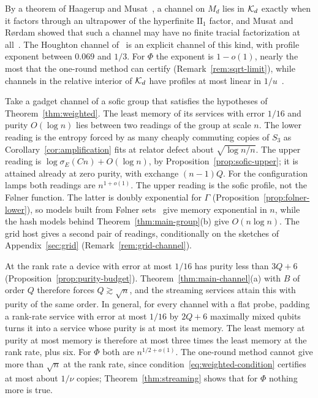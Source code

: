 By a theorem of Haagerup and Musat~\cite[Theorem~3.6]{HaagerupMusat2015}, a channel on $M_d$ lies in $\mathcal K_d$ exactly when it factors through an
ultrapower of the hyperfinite $\mathrm{II}_1$ factor, and Musat and R{\o}rdam showed that such a channel may have no finite tracial
factorization at all~\cite{MusatRordam2020}. The Houghton channel of~\cite[Theorem~D.1]{DouglasMghirbiB} is an explicit channel of this kind,
with profile exponent between $0.069$ and $1/3$. For $\Phi$ the exponent is $1-o(1)$, nearly the most that the one-round method can certify
(Remark~\ref{rem:sqrt-limit}), while channels in the relative interior of $\mathcal K_d$ have profiles at most linear in
$1/u$~\cite[Section~10]{DouglasMghirbiB}.

\begin{remark}\label{rem:sandwich}
Take a gadget channel of a sofic group that satisfies the hypotheses of Theorem~\ref{thm:weighted}. The least memory of its services with error
$1/16$ and purity $O(\log n)$ lies between two readings of the group at scale $n$. The lower reading is the entropy forced by as many cheaply
commuting copies of $S_3$ as Corollary~\ref{cor:amplification} fits at relator defect about $\sqrt{\log n/n}$. The upper reading is
$\log\sigma_E(Cn)+O(\log n)$, by Proposition~\ref{prop:sofic-upper}; it is attained already at zero purity, with exchange $(n-1)Q$. For the
configuration lamps both readings are $n^{1+o(1)}$. The upper reading is the sofic profile, not the F{\o}lner function. The latter is doubly
exponential for $\Gamma$ (Proposition~\ref{prop:folner-lower}), so models built from F{\o}lner sets~\cite[Proposition~3.14]{Cornulier2013} give
memory exponential in $n$, while the hash models behind Theorem~\ref{thm:main-group}(b) give $O(n\log n)$. The grid host gives a second pair
of readings, conditionally on the sketches of Appendix~\ref{sec:grid} (Remark~\ref{rem:grid-channel}).
\end{remark}

\begin{remark}\label{rem:sqrt-limit}
At the rank rate a device with error at most $1/16$ has purity less than $3Q+6$ (Proposition~\ref{prop:purity-budget}).
Theorem~\ref{thm:main-channel}(a) with $B$ of order $Q$ therefore forces $Q\gtrsim\sqrt n$, and the streaming services attain this with purity
of the same order. In general, for every channel with a flat probe, padding a rank-rate service with error at most $1/16$ by $2Q+6$ maximally mixed
qubits turns it into a service whose purity is at most its memory. The least memory at purity at most memory is therefore at most three times
the least memory at the rank rate, plus six. For $\Phi$ both are $n^{1/2+o(1)}$. The one-round method cannot give more than $\sqrt n$ at the
rank rate, since condition~\eqref{eq:weighted-condition} certifies at most about $1/\nu$ copies; Theorem~\ref{thm:streaming} shows that for
$\Phi$ nothing more is true.
\end{remark}
